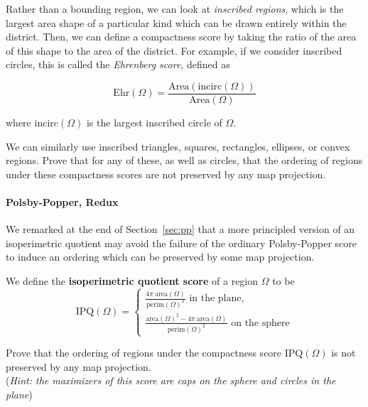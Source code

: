 Rather than a bounding region, we can look at \textit{inscribed regions}, which is the largest area shape of a particular kind which can be drawn entirely within the district.  Then, we can define a compactness score by taking the ratio of the area of this shape to the area of the district.  For example, if we consider inscribed circles, this is called the \textit{Ehrenberg score}, defined as

$$\mathrm{Ehr}(\Omega) = \frac{\mathrm{Area}(\mathrm{incirc}(\Omega))}{\mathrm{Area}(\Omega)}$$

where $\mathrm{incirc}(\Omega)$ is the largest inscribed circle of $\Omega$.

We can similarly use inscribed triangles, squares, rectangles, ellipses, or convex regions.  Prove that for any of these, as well as circles, that the ordering of regions under these compactness scores are not preserved by any map projection.



\paragraph{Polsby-Popper, Redux}
We remarked at the end of Section~\ref{sec:pp} that a more principled version of an isoperimetric quotient may avoid the failure of the ordinary Polsby-Popper score to induce an ordering which can be preserved by some map projection.

	We define the \textbf{isoperimetric quotient score} of a region $\Omega$ to be$$
	\mathrm{IPQ}(\Omega)=
	\begin{cases}
	\frac{4\pi \ \mathrm{area}(\Omega)}{\mathrm{perim}(\Omega)^2} \text{ in the plane},\\[10pt]
	\frac{\mathrm{area}(\Omega)^2 - 4\pi \ \mathrm{area}(\Omega)}{\mathrm{perim}(\Omega)^2}\text{ on the sphere}
	\end{cases}
	$$

Prove that the ordering of regions  under the compactness score $\mathrm{IPQ}(\Omega)$ is not preserved by any map projection.\\ (\textit{Hint: the maximizers of this score are caps on the sphere and circles in the plane})
	
	